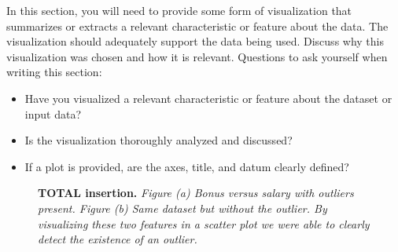 \documentclass[twoside,openright,titlepage,numbers=noenddot,headinclude,%
               footinclude=true,cleardoublepage=empty,abstractoff,BCOR=5mm,%
               paper=a4,fontsize=11pt,ngerman,american]{scrreprt}
\numberwithin{theorem}{chapter}
\numberwithin{definition}{chapter}
\numberwithin{algorithm}{chapter}
\numberwithin{figure}{chapter}
\numberwithin{table}{chapter}
\numberwithin{equation}{chapter}
\begin{document}
\begin{itemize}
In this section, you will need to provide some form of visualization that summarizes or extracts a relevant characteristic or feature about the data. The visualization should adequately support the data being used. Discuss why this visualization was chosen and how it is relevant. Questions to ask yourself when writing this section:
\begin{itemize}%
\item Have you visualized a relevant characteristic or feature about the dataset or input data?
\item Is the visualization thoroughly analyzed and discussed?
\item If a plot is provided, are the axes, title, and datum clearly defined?
\end{itemize}

\begin{figure}[!hbtp]
\centering
    
    \caption{\textbf{TOTAL insertion.} \textit{Figure (a) Bonus versus salary with outliers present. Figure (b) Same dataset but without the outlier. By visualizing these two features in a scatter plot we were able to clearly detect the existence of an outlier.}}
\end{figure}


\end{itemize}
\end{document}
